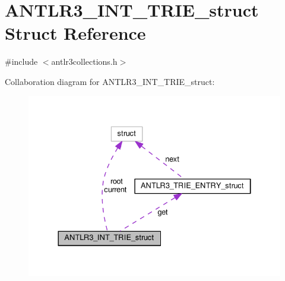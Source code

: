 \hypertarget{struct_a_n_t_l_r3___i_n_t___t_r_i_e__struct}{\section{A\-N\-T\-L\-R3\-\_\-\-I\-N\-T\-\_\-\-T\-R\-I\-E\-\_\-struct Struct Reference}
\label{struct_a_n_t_l_r3___i_n_t___t_r_i_e__struct}
}


{\ttfamily \#include $<$antlr3collections.\-h$>$}



Collaboration diagram for A\-N\-T\-L\-R3\-\_\-\-I\-N\-T\-\_\-\-T\-R\-I\-E\-\_\-struct\-:
\nopagebreak
\begin{figure}[H]
\begin{center}
\leavevmode
\includegraphics[width=333pt]{struct_a_n_t_l_r3___i_n_t___t_r_i_e__struct__coll__graph}
\end{center}
\end{figure}
